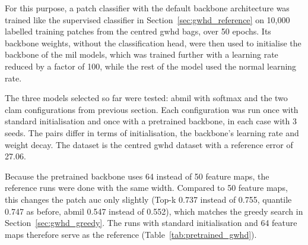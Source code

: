 \documentclass[12pt,parskip = half, DIV=classic,listof=totoc]{scrartcl}
\begin{document}
			For this purpose, a patch classifier with the default backbone architecture was trained like the supervised classifier in Section~\ref{sec:gwhd_reference}
			on 10,000 labelled training patches from the centred \ac{gwhd} bags, over 50
			epochs. Its backbone weights, without the classification head, were then used to initialise the backbone 
			of the \ac{mil} models, which was trained further with a learning rate reduced by a 
			factor of 100, while the rest of the model used the normal learning rate.

			The three models selected so far were tested: \ac{abmil} with
			softmax and the two \ac{clam} configurations from previous section. Each
			configuration was run once with standard initialisation and once with a pretrained
			backbone, in each case with 3 seeds. The pairs differ in terms of
			initialisation, the backbone’s learning rate and weight decay. The dataset is the centred
			\ac{gwhd} dataset with a reference error of 27.06.

			Because the pretrained backbone uses 64 instead of 50 feature maps, the reference runs were 
			done with the same width. Compared to 50 feature maps, this changes the patch \ac{auc} only slightly 
			(Top-k 0.737 instead of 0.755, quantile 0.747 as before, \ac{abmil} 0.547 instead of 0.552), 
			which matches the greedy search in Section~\ref{sec:gwhd_greedy}. The runs with standard initialisation 
			and 64 feature maps therefore serve as the reference (Table~\ref{tab:pretrained_gwhd}).
\end{document}
